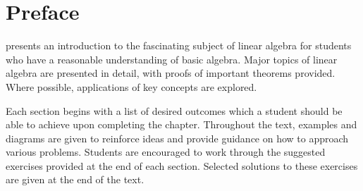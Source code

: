 \chapter*{Preface}

\textit{\bookfulltitle} presents an introduction to the fascinating subject of linear algebra for students who have a reasonable understanding of basic algebra. Major topics of linear algebra are presented in detail, with proofs of important theorems provided. Where possible, applications of key concepts are explored.

Each section begins with a list of desired outcomes which a student should be able to achieve upon completing the chapter.  Throughout the text, examples
and diagrams are given to reinforce ideas and provide guidance on how
to approach various problems. Students are encouraged to work through the suggested exercises provided at the end of each section. Selected solutions to these exercises are given at the end of the text. 
